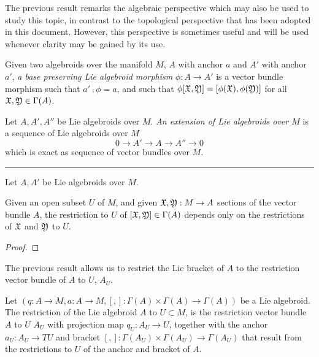 The previous result remarks the algebraic perspective which may also be used to study this topic, in contrast to the topological perspective that has been adopted in this document. However, this perspective is sometimes useful and will be used whenever clarity may be gained by its use.


\begin{definition}  
Given two algebroids over the manifold $M$, $A$ with anchor $a$ and $A'$ with anchor $a'$, \emph{a base preserving Lie algebroid morphism} $\phi: A \to A'$ is a vector bundle morphism such that $a' \comp \phi = a $, and such that $\phi[\mathfrak{X}, \mathfrak{Y}] = [\phi(\mathfrak{X}), \phi(\mathfrak{Y})]$ for all $\mathfrak{X}, \mathfrak{Y} \in \Gamma(A)$. 
\end{definition}

\begin{definition} 
Let $A, A', A''$ be Lie algebroids over $M$. \emph{An extension of Lie algebroids over $M$} is a sequence of Lie algebroids over $M$ \[ 0 \to A' \to A \to A'' \to 0 \] which is exact as sequence of vector bundles over $M$.
\end{definition}

\rule{10cm}{1mm}

\begin{definition}
Let $A, A'$ be Lie algebroids over $M$. 
\end{definition}

\begin{proposition}
Given an open subset $U$ of $M$, and given $\mathfrak{X}, \mathfrak{Y} : M \to A$ sections of the vector bundle $A$, the restriction to $U$ of $[\mathfrak{X}, \mathfrak{Y}] \in \Gamma(A)$ depends only on the restrictions of $\mathfrak{X}$ and $\mathfrak{Y}$ to $U$.
\end{proposition}
\begin{proof}

\end{proof}

The previous result allows us to restrict the Lie bracket of $A$ to the restriction vector bundle of $A$ to $U$, $A_U$.

\begin{definition}
Let $(q:A \to M, a: A \to M, [,]:\Gamma(A)\times \Gamma(A) \to \Gamma(A))$ be a Lie algebroid. The restriction of the Lie algebroid $A$ to $U \subset M$, is the restriction vector bundle $A$ to $U$ $A_U$ with projection map $q_U: A_U \to U$, together with the anchor $a_U:A_U \to TU$ and bracket $[,]:\Gamma(A_U)\times \Gamma(A_U) \to \Gamma(A_U)$ that result from the restrictions to $U$ of the anchor and bracket of $A$.
\end{definition}

